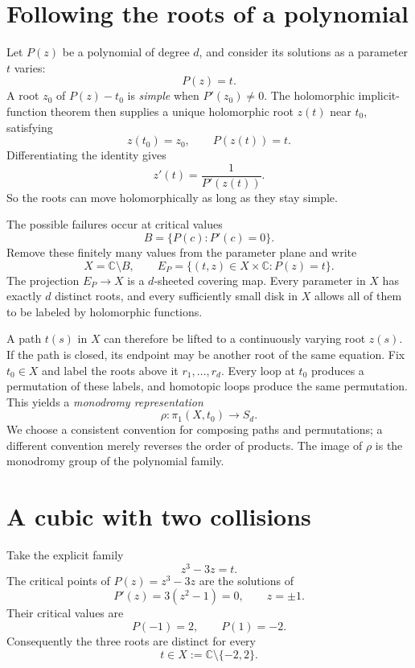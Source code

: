 \section{Following the roots of a polynomial}

Let \(P(z)\) be a polynomial of degree \(d\), and consider its solutions as a parameter \(t\) varies:
\[
 P(z)=t.
\]
A root \(z_0\) of \(P(z)-t_0\) is \emph{simple} when \(P'(z_0)\ne0\). The holomorphic implicit-function theorem then supplies a unique holomorphic root \(z(t)\) near \(t_0\), satisfying
\[
 z(t_0)=z_0,\qquad P(z(t))=t.
\]
Differentiating the identity gives
\begin{equation}
 z'(t)=\frac{1}{P'(z(t))}.
 \label{eq:N20261030-implicit}
\end{equation}
So the roots can move holomorphically as long as they stay simple.

The possible failures occur at critical values
\[
 B=\{P(c):P'(c)=0\}.
\]
Remove these finitely many values from the parameter plane and write
\[
 X=\mathbb C\setminus B,\qquad
 E_P=\{(t,z)\in X\times\mathbb C:P(z)=t\}.
\]
The projection \(E_P\to X\) is a \(d\)-sheeted covering map. Every parameter in \(X\) has exactly \(d\) distinct roots, and every sufficiently small disk in \(X\) allows all of them to be labeled by holomorphic functions.

A path \(t(s)\) in \(X\) can therefore be lifted to a continuously varying root \(z(s)\). If the path is closed, its endpoint may be another root of the same equation. Fix \(t_0\in X\) and label the roots above it \(r_1,\ldots,r_d\). Every loop at \(t_0\) produces a permutation of these labels, and homotopic loops produce the same permutation. This yields a \emph{monodromy representation}
\begin{equation}
 \rho:\pi_1(X,t_0)\longrightarrow S_d.
 \label{eq:N20261030-monodromy}
\end{equation}
We choose a consistent convention for composing paths and permutations; a different convention merely reverses the order of products. The image of \(\rho\) is the monodromy group of the polynomial family.

\section{A cubic with two collisions}

Take the explicit family
\begin{equation}
 z^3-3z=t.
 \label{eq:N20261030-cubic}
\end{equation}
The critical points of \(P(z)=z^3-3z\) are the solutions of
\[
 P'(z)=3(z^2-1)=0,
 \qquad z=\pm1.
\]
Their critical values are
\[
 P(-1)=2,\qquad P(1)=-2.
\]
Consequently the three roots are distinct for every
\[
 t\in X:=\mathbb C\setminus\{-2,2\}.
\]

